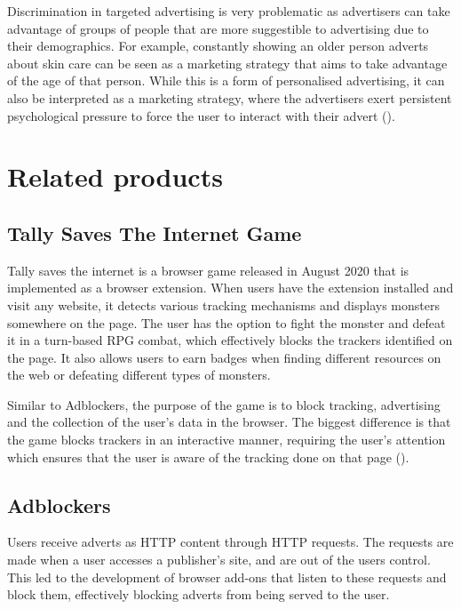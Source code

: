 \documentclass{l4proj}
\begin{document}
Discrimination in targeted advertising is very problematic as advertisers can take advantage of groups of people that are more suggestible to advertising due to their demographics. For example, constantly showing an older person adverts about skin care can be seen as a marketing strategy that aims to take advantage of the age of that person. While this is a form of personalised advertising, it can also be interpreted as a marketing strategy, where the advertisers exert persistent psychological pressure to force the user to interact with their advert (\cite{fennis2015psychology}).


\section{Related products}
\subsection{Tally Saves The Internet Game}
Tally saves the internet is a browser game released in August 2020 that is implemented as a browser extension. When users have the extension installed and visit any website, it detects various tracking mechanisms and displays monsters somewhere on the page. The user has the option to fight the monster and defeat it in a turn-based RPG combat, which effectively blocks the trackers identified on the page. It also allows users to earn badges when finding different resources on the web or defeating different types of monsters.

Similar to Adblockers, the purpose of the game is to block tracking, advertising and the collection of the user's data in the browser. The biggest difference is that the game blocks trackers in an interactive manner, requiring the user's attention which ensures that the user is aware of the tracking done on that page (\cite{tally}). 

\subsection{Adblockers}
Users receive adverts as HTTP content through HTTP requests. The requests are made when a user accesses a publisher's site, and are out of the users control. This led to the development of browser add-ons that listen to these requests and block them, effectively blocking adverts from being served to the user. 
\end{document}

